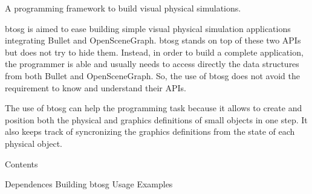 A programming framework to build visual physical simulations.

btosg is aimed to ease building simple visual physical simulation applications integrating Bullet and Open\+Scene\+Graph. btosg stands on top of these two A\+P\+Is but does not try to hide them. Instead, in order to build a complete application, the programmer is able and usually needs to access directly the data structures from both Bullet and Open\+Scene\+Graph. So, the use of btosg does not avoid the requirement to know and understand their A\+P\+Is.

The use of btosg can help the programming task because it allows to create and position both the physical and graphics definitions of small objects in one step. It also keeps track of syncronizing the graphics definitions from the state of each physical object.

Contents

Dependences Building btosg Usage Examples 